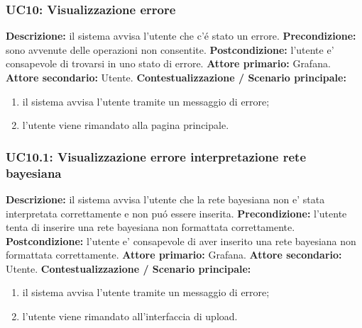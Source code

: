                 \subsubsection{UC10: Visualizzazione errore}
                    \textbf{Descrizione:}  il sistema avvisa l’utente che c’é stato un errore.
                    \newline
                    \textbf{Precondizione:} sono avvenute delle operazioni non consentite.
                    \newline
                    \textbf{Postcondizione:} l’utente e’ consapevole di trovarsi in uno stato di errore.
                    \newline
                    \textbf{Attore primario:} Grafana.
                    \newline
                    \textbf{Attore secondario:} Utente.
                    \newline
                    \textbf{Contestualizzazione / Scenario principale:} \begin{enumerate}
                            \item il sistema avvisa l’utente tramite un messaggio di errore;
                            \item l’utente viene rimandato alla pagina principale.
                        \end{enumerate}
                        
                \subsubsection{UC10.1: Visualizzazione errore interpretazione rete bayesiana}
                    \textbf{Descrizione:}  il sistema avvisa l’utente che la rete bayesiana non e’ stata interpretata correttamente e non puó essere inserita.
                    \newline
                    \textbf{Precondizione:} l’utente tenta di inserire una rete bayesiana non formattata correttamente.
                    \newline
                    \textbf{Postcondizione:} l’utente e’ consapevole di aver inserito una rete bayesiana non formattata correttamente.
                    \newline
                    \textbf{Attore primario:} Grafana.
                    \newline
                    \textbf{Attore secondario:} Utente.
                    \newline
                    \textbf{Contestualizzazione / Scenario principale:} \begin{enumerate}
                            \item il sistema avvisa l’utente tramite un messaggio di errore;
                            \item l’utente viene rimandato all’interfaccia di upload.
                        \end{enumerate}
                
